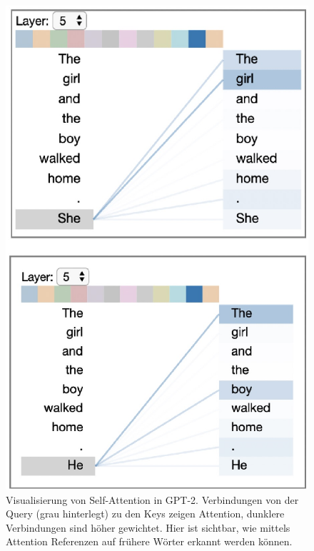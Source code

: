 \documentclass[conference]{IEEEtran}
\begin{document}
\begin{figure}[htbp]
\centerline{\includegraphics{img/attention_visualized.png}}
\caption{Visualisierung von Self-Attention in GPT-2. Verbindungen von der Query (grau hinterlegt) zu den Keys zeigen Attention, dunklere Verbindungen sind höher gewichtet. Hier ist sichtbar, wie mittels Attention Referenzen auf frühere Wörter erkannt werden können. \cite{visualization_of_attention}}
\label{fig:4}
\end{figure}
\end{document}
